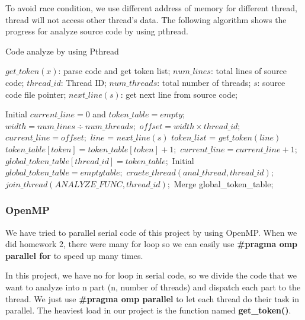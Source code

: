 \documentclass{acm_proc_article-sp}
\begin{document}
	To avoid race condition, we use different address of memory
	for different thread, thread will not access other thread's data. The following algorithm shows
	the progress for analyze source code by using pthread.
	\begin{algorithm}[h]
		\caption{Code analyze by using Pthread}
		\begin{algorithmic}[1]
			\Require
				$get\_token(x)$: parse code and get token list;
				$num\_lines$: total lines of source code;
				$thread\_id$: Thread ID;
				$num\_threads$: total number of threads;
				$s$: source code file pointer;
				$next\_line(s)$: get next line from source code;

				\State Initial $current\_line=0$ and $token\_table = empty$;
				\State $width = num\_lines \div num\_threads;$
				\State $offset = width \times thread\_id;$
				\State $current\_line = offset;$
					\State $line$ = $next\_line(s)$
					\State $token\_list$ = $get\_token(line)$
						\State $token\_table[token] = token\_table[token] + 1;$
					\EndFor
					\State $current\_line = current\_line + 1;$
				\EndWhile
				\State $global\_token\_table[thread\_id] = token\_table;$
			\EndFunction
			\State Initial $global\_token\_table = empty table;$
				\State $craete\_thread(anal\_thread, thread\_id);$
			\EndFor
				\State $join\_thread(ANALYZE\_FUNC, thread\_id);$
			\EndFor
			\State Merge global\_token\_table;
		\end{algorithmic}
	\end{algorithm}

	
\subsubsection{OpenMP}
	We have tried to parallel serial code of this project by using OpenMP. When we did homework 2,
	there were many for loop so we can easily use \textbf{\#pragma omp parallel for} to speed up many times.

In this project, we have no for loop in serial code, so we divide the code that we want to analyze into n part (n, number of threads) and dispatch each part to the thread. We just use \textbf{\#pragma omp parallel} to let each thread do their task in parallel. The heaviest load in our project is the function named \textbf{get\_token()}.
\end{document}
